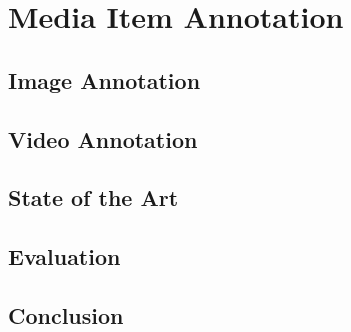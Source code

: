 

\chapter{Media Item Annotation}

\ifpdf
    \graphicspath{{6_media_item_annotation/figures/PNG/}{6_media_item_annotation/figures/PDF/}{6_media_item_annotation/figures/}}
\else
    \graphicspath{{6_media_item_annotation/figures/EPS/}{6_media_item_annotation/figures/}}
\fi


\section{Image Annotation}

\section{Video Annotation}

\section{State of the Art}

\section{Evaluation}

\section{Conclusion}